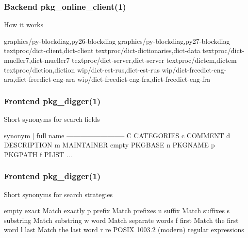 \documentclass[hyperref=unicode,ascii,xcolor=dvipsnames]{beamer}
\begin{document}

\begin{frame}[fragile]
  \frametitle{Backend pkg\_online\_client(1)}
  \begin{block}{How it works}
    \begin{Code}{}
graphics/py-blockdiag,py26-blockdiag
graphics/py-blockdiag,py27-blockdiag
textproc/dict-client,dict-client
textproc/dict-dictionaries,dict-data
textproc/dict-mueller7,dict-mueller7
textproc/dict-server,dict-server
textproc/dictem,dictem
textproc/diction,diction
wip/dict-est-rus,dict-est-rus
wip/dict-freedict-eng-ara,dict-freedict-eng-ara
wip/dict-freedict-eng-fra,dict-freedict-eng-fra
\prompt{#}
    \end{Code}
  \end{block}
\end{frame}


\begin{frame}[fragile]
  \frametitle{Frontend pkg\_digger(1)}
  \begin{block}{Short synonyms for search fields}
    \begin{Code}{}
synonym | full name
--------------------------
     C   CATEGORIES
     c   COMMENT
     d   DESCRIPTION
     m   MAINTAINER
 empty   PKGBASE
     n   PKGNAME
     p   PKGPATH
     f   PLIST
   ...
\prompt{#}
    \end{Code}
  \end{block}
\end{frame}


\begin{frame}[fragile]
  \frametitle{Frontend pkg\_digger(1)}
  \begin{block}{Short synonyms for search strategies}
    \begin{Code}{}
 empty     exact   Match exactly
   p       prefix   Match prefixes
   u       suffix   Match suffixes
   s    substring   Match substring
   w         word   Match separate words
   f        first   Match the first word
   l         last   Match the last word
   r           re   POSIX 1003.2 (modern)
                    regular expressions
\prompt{#}
    \end{Code}
  \end{block}
\end{frame}
\end{document}
